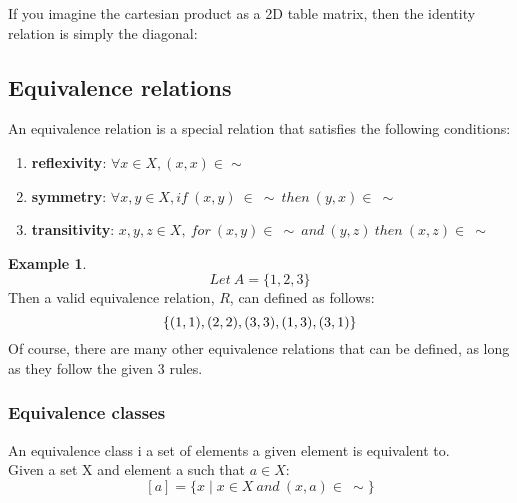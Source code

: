 \documentclass{article}
\theoremstyle{definition}
\newtheorem{ex}{Example}[section]
\begin{document}
If you imagine the cartesian product as a 2D table matrix, then the identity relation is simply the diagonal: 
\begin{table}[h!]
\centering
{}
\end{table}

\subsection{Equivalence relations}
An equivalence relation is a special relation that satisfies the following conditions:
\begin{enumerate}
	\item \textbf{reflexivity}: $\forall x \in X, (x,x) \in \sim $
	\item \textbf{symmetry}: $\forall x,y \in X, if\ (x,y)\ \in\ \sim\ then\ (y,x) \in\ \sim$
	\item \textbf{transitivity}: $x,y,z \in X,\ for\ (x,y) \in\ \sim\ and\ (y,z)\ then\ (x,z) \in\ \sim$
\end{enumerate}

\begin{ex}
	\[Let\ A = \{1,2,3\}\]
	Then a valid equivalence relation, $R$, can defined as follows: \\
	\[	\{ (1,1), \\
		(2,2),\\
		(3,3),\\
		(1,3),\\
		(3,1)\\
	\}
\]
	Of course, there are many other equivalence relations that can be defined, as long as they follow the given 3 rules.
\end{ex}

\subsubsection{Equivalence classes}
An equivalence class i a set of elements a given element is equivalent to. \\
Given a set X and element a such that $a \in X$:
\[ [a] = \{ x \mid x \in X\ and\ (x,a) \in\ \sim \}\]
\end{document}

